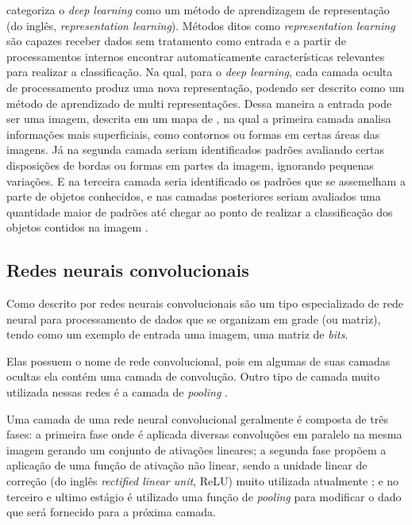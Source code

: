 \par {} categoriza o \textit{deep learning} como um método de aprendizagem de representação (do inglês, \textit{representation learning}). Métodos ditos como \textit{representation learning} são capazes receber dados sem tratamento como entrada e a partir de processamentos internos encontrar automaticamente características relevantes para realizar a classificação. Na qual, para o \textit{deep learning}, cada camada oculta de processamento produz uma nova representação, podendo ser descrito como um método de aprendizado de multi representações. Dessa maneira a entrada pode ser uma imagem, descrita em um mapa de , na qual a primeira camada analisa informações mais superficiais, como contornos ou formas em certas áreas das imagens. Já na segunda camada seriam identificados padrões avaliando certas disposições de bordas ou formas em partes da imagem, ignorando pequenas variações. E na terceira camada seria identificado os padrões que se assemelham a parte de objetos conhecidos, e nas camadas posteriores seriam avaliados uma quantidade maior de padrões até chegar ao ponto de realizar a classificação dos objetos contidos na imagem \cite{lecun2015deep}.

\subsection{Redes neurais convolucionais}
Como descrito por  redes neurais convolucionais são um tipo especializado de rede neural para processamento de dados que se organizam em grade (ou matriz), tendo como um exemplo de entrada uma imagem, uma matriz de \textit{bits}.
\par Elas possuem o nome de rede convolucional, pois em algumas de suas camadas ocultas ela contém uma camada de convolução. Outro tipo de camada muito utilizada nessas redes é a camada de \textit{pooling} \cite{Goodfellow-et-al-2016}.
\par Uma camada de uma rede neural convolucional geralmente é composta de três fases: a primeira fase onde é aplicada diversas convoluções em paralelo na mesma imagem gerando um conjunto de ativações lineares; a segunda fase propõem a aplicação de uma função de ativação não linear, sendo a unidade linear de correção (do inglês \textit{rectified linear unit}, ReLU) muito utilizada atualmente \cite{lecun2015deep}; e no terceiro e ultimo estágio é utilizado uma função de \textit{pooling} para modificar o dado que será fornecido para a próxima camada.    
